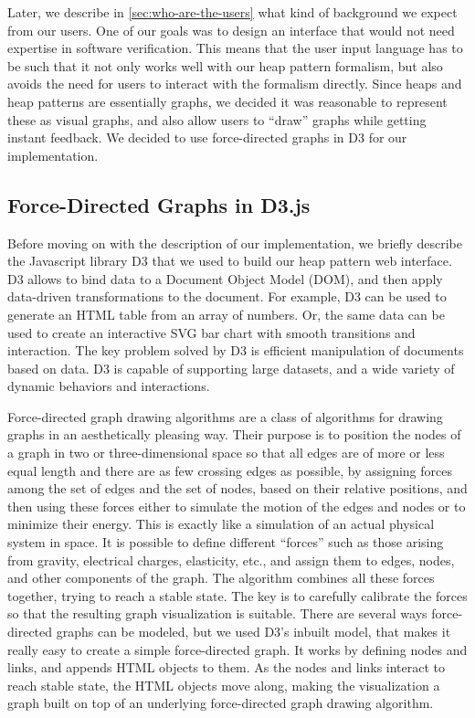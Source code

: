 Later, we describe in \autoref{sec:who-are-the-users} what kind of background we expect from our users. One of our goals was to design an interface that would not need expertise in software verification. This means that the user input language has to be such that it not only works well with our heap pattern formalism, but also avoids the need for users to interact with the formalism directly. Since heaps and heap patterns are essentially graphs, we decided it was reasonable to represent these as visual graphs, and also allow users to ``draw'' graphs while getting instant feedback. We decided to use force-directed graphs in D3 for our implementation.

\subsection{Force-Directed Graphs in D3.js}
Before moving on with the description of our implementation, we briefly describe the Javascript library D3 that we used to build our heap pattern web interface. D3 allows to bind data to a Document Object Model (DOM), and then apply data-driven transformations to the document. For example, D3 can be used to generate an HTML table from an array of numbers. Or, the same data can be used to create an interactive SVG bar chart with smooth transitions and interaction. The key problem solved by D3 is efficient manipulation of documents based on data. D3 is capable of supporting large datasets, and a wide variety of dynamic behaviors and interactions.

Force-directed graph drawing algorithms \cite{eades84, fruchterman91} are a class of algorithms for drawing graphs in an aesthetically pleasing way. Their purpose is to position the nodes of a graph in two or three-dimensional space so that all edges are of more or less equal length and there are as few crossing edges as possible, by assigning forces among the set of edges and the set of nodes, based on their relative positions, and then using these forces either to simulate the motion of the edges and nodes or to minimize their energy. This is exactly like a simulation of an actual physical system in space. It is possible to define different ``forces'' such as those arising from gravity, electrical charges, elasticity, etc., and assign them to edges, nodes, and other components of the graph. The algorithm combines all these forces together, trying to reach a stable state. The key is to carefully calibrate the forces so that the resulting graph visualization is suitable. There are several ways force-directed graphs can be modeled, but we used D3's inbuilt model, that makes it really easy to create a simple force-directed graph. It works by defining nodes and links, and appends HTML objects to them. As the nodes and links interact to reach stable state, the HTML objects move along, making the visualization a graph built on top of an underlying force-directed graph drawing algorithm.

